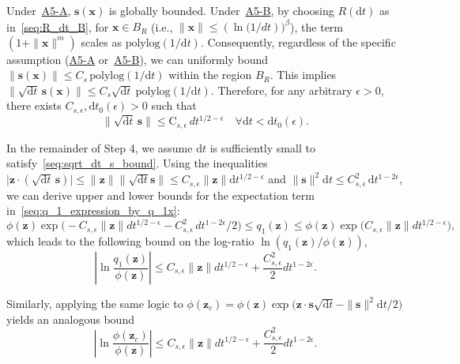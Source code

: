 Under~\hyperlink{assumption:A5-A}{A5-A}, $\bm s(\bm x)$ is globally bounded. Under~\hyperlink{assumption:A5-B}{A5-B}, by choosing $R(\mathrm dt)$ as in~\eqref{seq:R_dt_B}, for $\bm x\in B_R$ (i.e., $\|\bm x\|\leq (\ln\mathrm (1/dt))^\beta$), the term $(1+\|\bm x\|^m)$ scales as $\text{polylog}(1/\mathrm dt)$. Consequently, regardless of the specific assumption (\hyperlink{assumption:A5-A}{A5-A} or~\hyperlink{assumption:A5-B}{A5-B}), we can uniformly bound $\|\bm s(\bm x)\|\leq C_s\,\text{polylog}(1/\mathrm dt)$ within the region $B_R$. This implies $\|\sqrt{\mathrm dt}\,\bm s(\bm x)\|\leq C_s\sqrt{\mathrm dt}\ \text{polylog}(1/\mathrm dt)$. Therefore, for any arbitrary $\epsilon>0$, there exists $C_{s,\epsilon},\mathrm dt_0(\epsilon)>0$ such that
\begin{equation}
    \|\sqrt{\mathrm dt}\,\bm s\|\leq \mathrm C_{s,\epsilon}\,dt^{1/2-\epsilon}
    \quad\forall\mathrm dt<\mathrm dt_0(\epsilon).
    \label{seq:sqrt_dt_s_bound}
\end{equation}

In the remainder of Step 4, we assume $\mathrm dt$ is sufficiently small to satisfy~\eqref{seq:sqrt_dt_s_bound}. Using the inequalities $\big|\bm z\cdot(\sqrt{\mathrm dt}\,\bm s)\big|\leq\|\bm z\|\|\sqrt{\mathrm dt}\bm s\|\leq C_{s,\epsilon}\|\bm z\|\mathrm dt^{1/2-\epsilon}$ and $\|\bm s\|^2\mathrm dt\leq C_{s,\epsilon}^2\,\mathrm dt^{1-2\epsilon}$, we can derive upper and lower bounds for the expectation term in~\eqref{seq:q_1_expression_by_q_1x}:
\begin{equation}
    \phi(\bm z)\exp\big(\!-C_{s,\epsilon}\|\bm z\|dt^{1/2-\epsilon}
    -C_{s,\epsilon}^2\,dt^{1-2\epsilon}/2\big)
    \leq q_1(\bm z)
    \leq
    \phi(\bm z)\exp\big(C_{s,\epsilon}\|\bm z\|dt^{1/2-\epsilon}\big),
    \label{seq:p1_sandwitch_bound}
\end{equation}
which leads to the following bound on the log-ratio $\ln(q_1(\bm z)/\phi(\bm z))$,
\begin{equation}
    \left|\ln\frac{q_1(\bm z)}{\phi(\bm z)}\right|
    \leq
    C_{s,\epsilon}\|\bm z\|dt^{1/2-\epsilon}+
    \frac{C_{s,\epsilon}^2}{2}dt^{1-2\epsilon}.
    \label{seq:p1_z_bound}
\end{equation}

Similarly, applying the same logic to $\phi(\bm z_c)=\phi(\bm z)\exp\!\big(\bm z\cdot\bm s\sqrt{\mathrm dt}-\|\bm s\|^2\mathrm dt/2\big)$ yields an analogous bound
\begin{equation}
    \left|\ln\frac{\phi(\bm z_c)}{\phi(\bm z)}\right|
    \leq
    C_{s,\epsilon}\|\bm z\|dt^{1/2-\epsilon}+
    \frac{C_{s,\epsilon}^2}{2}dt^{1-2\epsilon}.
    \label{seq:phi_z_c_bound}
\end{equation}

